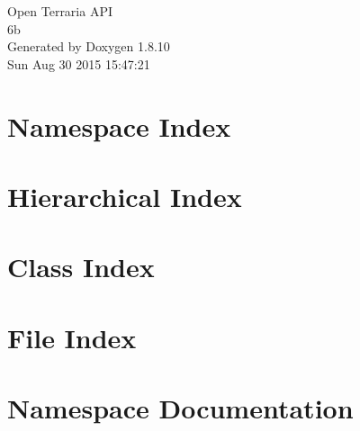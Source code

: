 \documentclass[twoside]{book}
\newcommand{\+}{\discretionary{\mbox{\scriptsize$\hookleftarrow$}}{}{}}
\newcommand{\clearemptydoublepage}{%
  \newpage{\pagestyle{empty}\cleardoublepage}%
}
\begin{document}
\hypersetup{pageanchor=false,
             bookmarks=true,
             bookmarksnumbered=true,
             pdfencoding=unicode
            }
\begin{titlepage}
\vspace*{7cm}
\begin{center}%
{\Large Open Terraria A\+P\+I \\[1ex]\large 6b }\\
\vspace*{1cm}
{\large Generated by Doxygen 1.8.10}\\
\vspace*{0.5cm}
{\small Sun Aug 30 2015 15:47:21}\\
\end{center}
\end{titlepage}
\clearemptydoublepage
\tableofcontents
\clearemptydoublepage
{}
\hypersetup{pageanchor=true}

\chapter{Namespace Index}

\chapter{Hierarchical Index}

\chapter{Class Index}

\chapter{File Index}

\chapter{Namespace Documentation}




















\end{document}
